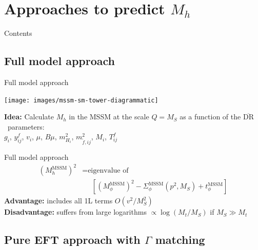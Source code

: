 \documentclass[hyperref={pdfpagelabels=false},ngerman]{beamer}
\renewcommand{\emph}{\textbf}
\newcommand{\DRbar}{\ensuremath{\overline{\text{DR}}}}
\begin{document}
\section{Approaches to predict $M_h$}

\begin{frame}{Contents}
  \tableofcontents[currentsection]  
\end{frame}

\subsection{Full model approach}

\begin{frame}{Full model approach}
  \begin{center}
    \texttt{[image: images/mssm-sm-tower-diagrammatic]}\\[1em]
  \end{center}
  \emph{Idea:} Calculate $M_h$ in the MSSM at the scale $Q = M_S$ as a function of the \DRbar\ parameters:\\[1em]
  \centering $g_i$, $y^f_{ij}$, $v_i$, $\mu$, $B\mu$, $m^2_{H_i}$,
  $m_{\tilde{f},ij}^2$, $M_i$, $T^f_{ij}$
\end{frame}

\begin{frame}{Full model approach}
  \begin{align*}
    (M_h^\text{MSSM})^2 &= \text{eigenvalue of} \\
    &\phantom{={}} \left[(M_\phi^\text{MSSM})^2 - \Sigma^\text{MSSM}_\phi(p^2,M_S)
      + t_\phi^\text{MSSM}\right]
  \end{align*}
  \emph{Advantage:} includes all 1L terms $O(v^2/M_S^2)$\\
  \emph{Disadvantage:} suffers from large logarithms $\propto\log(M_t/M_S)$ if $M_S\gg M_t$\\
\end{frame}


\subsection{Pure EFT approach with $\Gamma$ matching}
\end{document}
